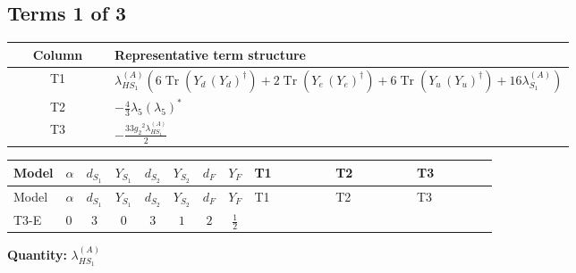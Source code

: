 \documentclass[8pt]{article}
\begin{document}
\begin{landscape}
\subsection*{Terms 1 of 3}
\begin{center}
\begin{tabular}{@{}c >{\raggedright\arraybackslash}p{0.82\linewidth}@{}}
\toprule
Column & Representative term structure \\
\midrule
T1 & \(\displaystyle {\lambda_{HS_1}^{(A)}} (6 \operatorname{Tr}\!\left({Y_d}\,\left({Y_d}\right)^{\dagger}\right)+2 \operatorname{Tr}\!\left({Y_e}\,\left({Y_e}\right)^{\dagger}\right)+6 \operatorname{Tr}\!\left({Y_u}\,\left({Y_u}\right)^{\dagger}\right)+16 {\lambda_{S_1}^{(A)}})\) \\
\midrule
T2 & \(\displaystyle -\frac{4}{3} {\lambda_5} \left({\lambda_5}\right)^{*}\) \\
\midrule
T3 & \(\displaystyle -\frac{33 {g_2}^2 {\lambda_{HS_1}^{(A)}}}{2}\) \\
\midrule
\bottomrule
\end{tabular}
\end{center}
\smallskip
\tiny
\begin{longtable}{@{}llcccccc >{\raggedright\arraybackslash}p{0.21\linewidth} >{\raggedright\arraybackslash}p{0.21\linewidth} >{\raggedright\arraybackslash}p{0.21\linewidth}@{}}
\toprule
Model & $\alpha$ & $d_{S_1}$ & $Y_{S_1}$ & $d_{S_2}$ & $Y_{S_2}$ & $d_F$ & $Y_F$ & T1 & T2 & T3 \\
\midrule
\endfirsthead
\toprule
Model & $\alpha$ & $d_{S_1}$ & $Y_{S_1}$ & $d_{S_2}$ & $Y_{S_2}$ & $d_F$ & $Y_F$ & T1 & T2 & T3 \\
\midrule
\endhead
T3-E & $0$ & $3$ & $0$ & $3$ & $1$ & $2$ & $\frac{1}{2}$ & \scriptsize\adjustbox{max width=\linewidth}{$\begin{gathered} {\lambda_{HS_1}^{(A)}} (6 \operatorname{Tr}\!\left({Y_d}\,\left({Y_d}\right)^{\dagger}\right)+2 \operatorname{Tr}\!\left({Y_e}\,\left({Y_e}\right)^{\dagger}\right)+6 \operatorname{Tr}\!\left({Y_u}\,\left({Y_u}\right)^{\dagger}\right)+16 {\lambda_{S_1}^{(A)}})\end{gathered}$} & \scriptsize\adjustbox{max width=\linewidth}{$\begin{gathered} -\frac{4}{3} {\lambda_5} \left({\lambda_5}\right)^{*}\end{gathered}$} & \scriptsize\adjustbox{max width=\linewidth}{$\begin{gathered} -\frac{33 {g_2}^2 {\lambda_{HS_1}^{(A)}}}{2}\end{gathered}$} \\
\midrule
\bottomrule
\end{longtable}
\clearpage
\noindent\textbf{Quantity: }$\lambda_{HS_1}^{(A)}$\par\smallskip

\end{landscape}
\end{document}
